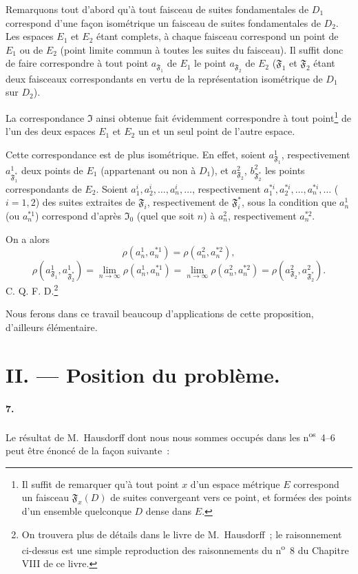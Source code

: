 \documentclass[a4paper,12pt]{amsart}
\newcommand{\fais}{\mathfrak{F}}
\newcommand{\iso}{\mathfrak{I}}
\newcommand{\srcpage}[1]{} %
\begin{document}
Remarquons tout d'abord qu'à tout faisceau de suites fondamentales de $D_1$ correspond d'une façon isométrique un faisceau de suites fondamentales de $D_2$. Les espaces $E_1$ et $E_2$ étant complets, à chaque faisceau correspond un point de $E_1$ ou de $E_2$ (point limite commun à toutes les suites du faisceau). Il suffit donc de faire correspondre à tout point $a_{\fais_1}$ de $E_1$ le point $a_{\fais_2}$ de $E_2$ ($\fais_1$ et $\fais_2$ étant deux faisceaux correspondants en vertu de la représentation isométrique de $D_1$ sur $D_2$).

La correspondance $\iso$ ainsi obtenue fait évidemment correspondre à tout point\footnote{Il suffit de remarquer qu'à tout point $x$ d'un espace métrique $E$ correspond un faisceau $\fais_x(D)$ de suites convergeant vers ce point, et formées des points d'un ensemble quelconque $D$ dense dans $E$.}
de l'un des deux espaces $E_1$ et $E_2$ un et un seul point de l'autre espace.

Cette correspondance est de plus isométrique. En effet, soient $a^1_{\fais_1}$, respectivement $a^1_{\fais_1^*}$ deux points de $E_1$ (appartenant ou non à $D_1$), et $a^2_{\fais_2}$, $b^2_{\fais_2^*}$ les points correspondants de $E_2$. Soient $a_1^i,a_2^i,\dots,a_n^i,\dots$, respectivement $a_1^{*i},a_2^{*i},\dots,a_n^{*i},\dots$ ($i=1,2$) des suites extraites de $\fais_i$, respectivement de $\fais_i^*$, sous la condition que $a_n^1$ (ou $a_n^{*1}$) correspond d'après $\iso_0$ (quel que soit $n$) à $a_n^2$, respectivement $a_n^{*2}$.

On a alors
\[
\rho(a_n^1,a_n^{*1})=\rho(a_n^2,a_n^{*2}),
\]
\[
\rho(a^1_{\fais_1},a^1_{\fais_2^*})
=\lim_{n\to\infty}\rho(a_n^1,a_n^{*1})
=\lim_{n\to\infty}\rho(a_n^2,a_n^{*2})
=\rho(a^2_{\fais_2},a^2_{\fais_2^*}).
\]
\hfill C. Q. F. D.\footnote{On trouvera plus de détails dans le livre de M.~Hausdorff~; le raisonnement ci-dessus est une simple reproduction des raisonnements du n\textsuperscript{o}~8 du Chapitre VIII de ce livre.}

Nous ferons dans ce travail beaucoup d'applications de cette proposition, d'ailleurs élémentaire.

\srcpage{50}
\section*{II. --- Position du problème.}
\paragraph{7.}
Le résultat de M.~Hausdorff dont nous nous sommes occupés dans les n\textsuperscript{os}~4--6 peut être énoncé de la façon suivante~:
\end{document}
